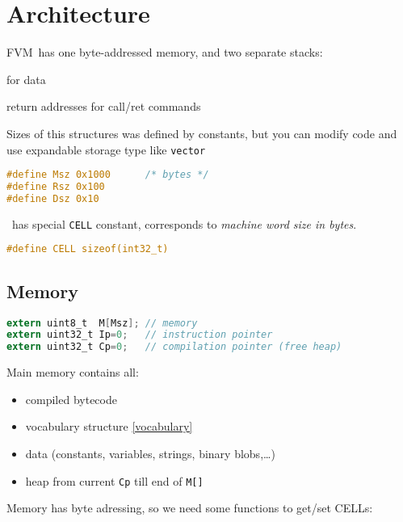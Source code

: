 \section{Architecture}

FVM\ has one byte-addressed memory, and two separate
stacks:
\begin{description}[nosep]
\item[data stack] for data 
\item[return stack] return addresses for call/ret commands
\end{description}

\bigskip
Sizes of this structures was defined by constants, but you can modify code and
use expandable storage type like \verb|vector|

\begin{lstlisting}[language=C]
#define Msz 0x1000		/* bytes */
#define Rsz 0x100
#define Dsz 0x10 
\end{lstlisting}

\clearpage\noindent
\F\ has special \verb|CELL| constant, corresponds to \textit{machine word size
in bytes}.

\begin{lstlisting}[language=C]
#define CELL sizeof(int32_t)
\end{lstlisting}

\subsection{Memory}

\begin{lstlisting}[language=C]
extern uint8_t  M[Msz];	// memory
extern uint32_t Ip=0;	// instruction pointer
extern uint32_t Cp=0;	// compilation pointer (free heap)
\end{lstlisting}

Main memory contains all:
\begin{itemize}[nosep]
  \item compiled bytecode
  \item vocabulary structure \ref{vocabulary}
  \item data (constants, variables, strings, binary blobs,\ldots)
  \item heap from current \verb|Cp| till end of \verb|M[]|
\end{itemize}

Memory has byte adressing, so we need some functions to get/set CELLs:

